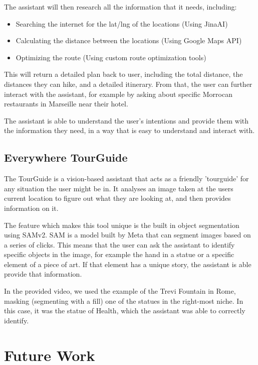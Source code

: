\documentclass{article}
\begin{document}
The assistant will then research all the information that it needs, including:

\begin{itemize}
\item Searching the internet for the lat/lng of the locations (Using JinaAI)
\item Calculating the distance between the locations (Using Google Maps API)
\item Optimizing the route (Using custom route optimization tools)
\end{itemize}

This will return a detailed plan back to user, including the total distance, the distances they can hike, and a detailed itinerary. From that, the user can further interact with the assistant, for example by asking about specific Morrocan restaurants in Marseille near their hotel.

The assistant is able to understand the user's intentions and provide them with the information they need, in a way that is easy to understand and interact with.

\subsection{Everywhere TourGuide}

The TourGuide is a vision-based assistant that acts as a friendly 'tourguide' for any situation the user might be in. It analyses an image taken at the users current location to figure out what they are looking at, and then provides information on it.

The feature which makes this tool unique is the built in object segmentation using SAMv2. SAM is a model built by Meta that can segment images based on a series of clicks. This means that the user can ask the assistant to identify specific objects in the image, for example the hand in a statue or a specific element of a piece of art. If that element has a unique story, the assistant is able provide that information.

In the provided video, we used the example of the Trevi Fountain in Rome, masking (segmenting with a fill) one of the statues in the right-most niche. In this case, it was the statue of Health, which the assistant was able to correctly identify.

\section{Future Work}
\end{document}
